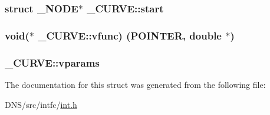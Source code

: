 \subsubsection[{\texorpdfstring{start}{start}}]{\setlength{\rightskip}{0pt plus 5cm}struct {\bf \+\_\+\+N\+O\+DE}$\ast$ \+\_\+\+C\+U\+R\+V\+E\+::start}\hypertarget{struct___c_u_r_v_e_ae81649593e56930c639d6f4b070f2e88}{}\label{struct___c_u_r_v_e_ae81649593e56930c639d6f4b070f2e88}
\subsubsection[{\texorpdfstring{vfunc}{vfunc}}]{\setlength{\rightskip}{0pt plus 5cm}void($\ast$ \+\_\+\+C\+U\+R\+V\+E\+::vfunc) ({\bf P\+O\+I\+N\+T\+ER}, double $\ast$)}\hypertarget{struct___c_u_r_v_e_acaa99689f99291857a4f910340e83478}{}\label{struct___c_u_r_v_e_acaa99689f99291857a4f910340e83478}
\subsubsection[{\texorpdfstring{vparams}{vparams}}]{ \+\_\+\+C\+U\+R\+V\+E\+::vparams}\hypertarget{struct___c_u_r_v_e_aaa3be6350d3646926fd4ad0c129c7bef}{}\label{struct___c_u_r_v_e_aaa3be6350d3646926fd4ad0c129c7bef}


The documentation for this struct was generated from the following file\+:\begin{DoxyCompactItemize}
\item 
D\+N\+S/src/intfc/\hyperlink{int_8h}{int.\+h}\end{DoxyCompactItemize}

